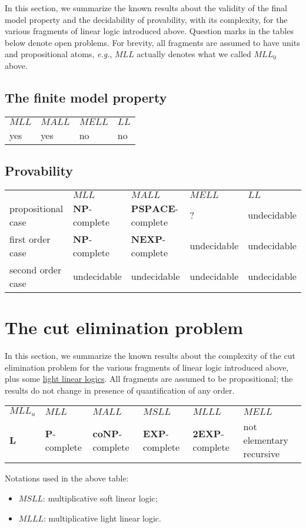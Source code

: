 In this section, we summarize the known results about the validity of
the final model property and the decidability of provability, with its
complexity, for the various fragments of linear logic introduced above.
Question marks in the tables below denote open problems. For brevity,
all fragments are assumed to have units and propositional atoms,
\emph{e.g.}, \(MLL\) actually denotes what we called \(MLL_0\) above.

\subsection{The finite model property}\label{the-finite-model-property}

\begin{longtable}[]{@{}llll@{}}
\toprule
\(MLL\) & \(MALL\) & \(MELL\) & \(LL\)\tabularnewline
yes & yes & no & no\tabularnewline
\bottomrule
\end{longtable}

\subsection{Provability}\label{provability}

\begin{longtable}[]{@{}lllll@{}}
\toprule
& \(MLL\) & \(MALL\) & \(MELL\) & \(LL\)\tabularnewline
propositional case & \(\mathbf{NP}\)-complete &
\(\mathbf{PSPACE}\)-complete & ? & undecidable\tabularnewline
first order case & \(\mathbf{NP}\)-complete & \(\mathbf{NEXP}\)-complete
& undecidable & undecidable\tabularnewline
second order case & undecidable & undecidable & undecidable &
undecidable\tabularnewline
\bottomrule
\end{longtable}

\section{The cut elimination problem}\label{the-cut-elimination-problem}

In this section, we summarize the known results about the complexity of
the cut elimination problem for the various fragments of linear logic
introduced above, plus some \hyperref[light-linear-logics]{light linear
logics}. All fragments are assumed to be propositional; the results do
not change in presence of quantification of any order.

\begin{longtable}[]{@{}llllll@{}}
\toprule
\(MLL_u\) & \(MLL\) & \(MALL\) & \(MSLL\) & \(MLLL\) &
\(MELL\)\tabularnewline
\(\mathbf L\) & \(\mathbf{P}\)-complete & \(\mathbf{coNP}\)-complete &
\(\mathbf{EXP}\)-complete & \(\mathbf{2EXP}\)-complete & not elementary
recursive\tabularnewline
\bottomrule
\end{longtable}

Notations used in the above table:
\begin{itemize}
\item \(MSLL\): multiplicative soft linear logic;
\item \(MLLL\): multiplicative light linear logic.
\end{itemize}


